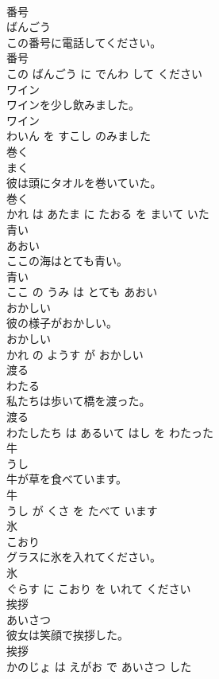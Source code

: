 \documentclass[8pt]{extreport}
\begin{document}
\begin{CJK}{UTF8}{min}
\\	番号	
\\	ばんごう			
\\	この番号に電話してください。	
\\	番号 
\\	この ばんごう に でんわ して ください			
\\	ワイン	
\\	ワインを少し飲みました。	
\\	ワイン 
\\	わいん を すこし のみました			
\\	巻く	
\\	まく			
\\	彼は頭にタオルを巻いていた。	
\\	巻く 
\\	かれ は あたま に たおる を まいて いた			
\\	青い	
\\	あおい			
\\	ここの海はとても青い。	
\\	青い 
\\	ここ の うみ は とても あおい			
\\	おかしい	
\\	彼の様子がおかしい。	
\\	おかしい 
\\	かれ の ようす が おかしい			
\\	渡る	
\\	わたる			
\\	私たちは歩いて橋を渡った。	
\\	渡る 
\\	わたしたち は あるいて はし を わたった			
\\	牛	
\\	うし			
\\	牛が草を食べています。	
\\	牛 
\\	うし が くさ を たべて います			
\\	氷	
\\	こおり			
\\	グラスに氷を入れてください。	
\\	氷 
\\	ぐらす に こおり を いれて ください			
\\	挨拶	
\\	あいさつ			
\\	彼女は笑顔で挨拶した。	
\\	挨拶 
\\	かのじょ は えがお で あいさつ した			

\end{CJK}
\end{document}
